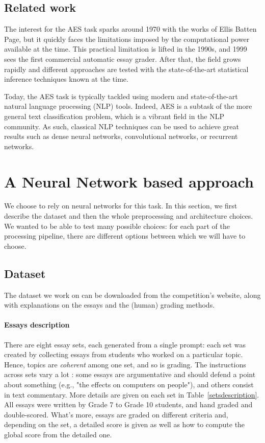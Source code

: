 \documentclass[a4paper,12pt,english]{article}
\begin{document}
\subsection{Related work}
The interest for the AES task sparks around 1970 with the works of Ellis Batten Page\cite{page1966imminence}, but it quickly faces the limitations imposed by the computational power available at the time. This practical limitation is lifted in the 1990s, and 1999 sees the first commercial automatic essay grader\cite{attali2004automated}. After that, the field grows rapidly and different approaches are tested with the state-of-the-art statistical inference techniques known at the time\cite{rudner2002automated}.\par
Today, the AES task is typically tackled using modern and state-of-the-art natural language processing (NLP) tools. Indeed, AES is a subtask of the more general text classification problem, which is a vibrant field in the NLP community. As such, classical NLP techniques can be used to achieve great results such as dense neural networks\cite{murray2012automatic}, convolutional networks\cite{kim2014convolutional}, or recurrent networks\cite{taghipour2016neural}.

\section{A Neural Network based approach}

We choose to rely on neural networks for this task.
In this section, we first describe the dataset and then the whole preprocessing and architecture choices. We wanted to be able to test many possible choices: for each part of the processing pipeline, there are different options between which we will have to choose.

\subsection{Dataset}
The dataset we work on can be downloaded from the competition's website\cite{kaggle}, along with explanations on the essays and the (human) grading methods.
\paragraph{Essays description} There are eight essay sets, each generated from a single prompt: each set was created by collecting essays from students who worked on a particular topic. Hence, topics are \emph{coherent} among one set, and so is grading. The instructions across sets vary a lot : some essays are argumentative and should defend a point about something (e.g., "the effects on computers on people"), and others consist in text commentary. More details are given on each set in Table~\ref{setsdescription}. All essays were written by Grade 7 to Grade 10 students, and hand graded and double-scored. What's more, essays are graded on different criteria and, depending on the set, a detailed score is given as well as how to compute the global score from the detailed one.
\end{document}
